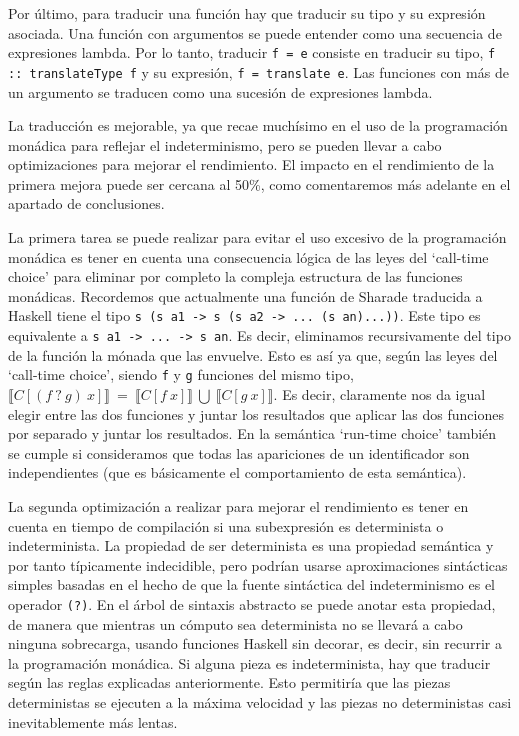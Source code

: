 \documentclass[class=article, crop=false]{standalone}
\begin{document}
Por último, para traducir una función hay que traducir su tipo y su expresión asociada.
Una función con argumentos se puede entender como una secuencia de expresiones lambda. Por
lo tanto, traducir \verb`f = e` consiste en traducir su tipo, \verb`f :: translateType f` y
su expresión, \verb`f = translate e`. Las funciones con más de un argumento se traducen como
una sucesión de expresiones lambda.

La traducción es mejorable, ya que recae muchísimo en el uso de la programación monádica
para reflejar el indeterminismo, pero se pueden llevar a cabo optimizaciones para mejorar
el rendimiento. El impacto en el rendimiento de la primera mejora puede ser cercana al 50\%,
como comentaremos más adelante en el apartado de conclusiones.

La primera tarea se puede realizar para evitar el uso excesivo de la programación monádica
es tener en cuenta una consecuencia lógica de las leyes del `call-time choice' para eliminar
por completo la compleja estructura de las funciones monádicas. Recordemos que actualmente
una función de Sharade traducida a Haskell tiene el tipo
\verb`s (s a1 -> s (s a2 -> ... (s an)...))`. Este tipo es equivalente a
\verb`s a1 -> ... -> s an`. Es decir, eliminamos recursivamente del tipo de la función la
mónada que las envuelve. Esto es así ya que, según las leyes del `call-time choice', siendo
\verb`f` y \verb`g` funciones del mismo tipo, $\llbracket C[(f \: ? \: g) \: x]\rrbracket
\: = \: \llbracket C[f \: x]\rrbracket \: \bigcup \: \llbracket C[g \: x]\rrbracket$. Es
decir, claramente nos da igual elegir entre las dos funciones y juntar los resultados que
aplicar las dos funciones por separado y juntar los resultados. En la semántica
`run-time choice' también se cumple si consideramos que todas las apariciones de un
identificador son  independientes (que es básicamente el comportamiento de esta semántica).

La segunda optimización a realizar para mejorar el rendimiento es tener en cuenta en tiempo
de compilación si una subexpresión es determinista o indeterminista. La propiedad de ser
determinista es una propiedad semántica y por tanto típicamente indecidible, pero podrían
usarse aproximaciones sintácticas simples basadas en el hecho de que la fuente sintáctica
del indeterminismo es el operador \verb`(?)`. En el árbol de sintaxis abstracto se puede
anotar esta propiedad, de manera que mientras un cómputo sea determinista no se llevará a
cabo ninguna sobrecarga, usando funciones Haskell sin decorar, es decir, sin recurrir a la
programación monádica. Si alguna pieza es indeterminista, hay que traducir según las reglas
explicadas anteriormente. Esto permitiría que las piezas deterministas se ejecuten a la
máxima velocidad y las piezas no deterministas casi inevitablemente más lentas.
\end{document}
